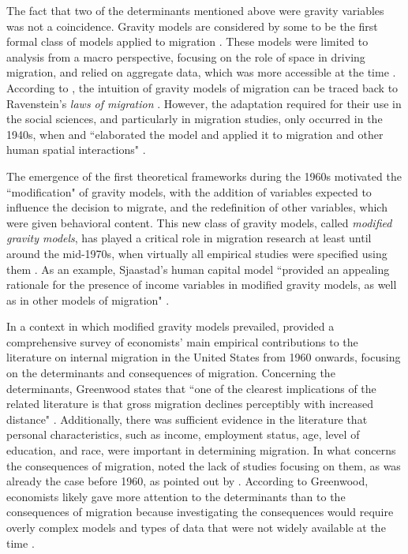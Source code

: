 The fact that two of the determinants mentioned above were gravity variables was not a coincidence. Gravity models are considered by some to be the first formal class of models applied to migration \citep{greenwood_early_2003, cushing_crossing_2004}. These models were limited to analysis from a macro perspective, focusing on the role of space in driving migration, and relied on aggregate data, which was more accessible at the time \citep{greenwood_research_1975, greenwood_internal_1997, greenwood_early_2003, cushing_crossing_2004}. According to \cite{greenwood_early_2003}, the intuition of gravity models of migration can be traced back to Ravenstein's \textit{laws of migration} \citep{ravenstein_laws_1885, ravenstein_laws_1889}. However, the adaptation required for their use in the social sciences, and particularly in migration studies, only occurred in the 1940s, when \cite{zipf_unity_1942, zipf_p1_1946} and \cite{stewart_empirical_1947} ``elaborated the model and applied it to migration and other human spatial interactions" \citep[p. 26]{greenwood_early_2003}.

The emergence of the first theoretical frameworks during the 1960s motivated the ``modification" of gravity models, with the addition of variables expected to influence the decision to migrate, and the redefinition of other variables, which were given behavioral content. This new class of gravity models, called \textit{modified gravity models}, has played a critical role in migration research at least until around the mid-1970s, when virtually all empirical studies were specified using them \citep{greenwood_research_1975, greenwood_internal_1997, greenwood_early_2003}. As an example, Sjaastad's human capital model ``provided an appealing rationale for the presence of income variables in modified gravity models, as well as in other models of migration" \citep[p. 670]{greenwood_internal_1997}. 

In a context in which modified gravity models prevailed, \cite{greenwood_research_1975} provided a comprehensive survey of economists' main empirical contributions to the literature on internal migration in the United States from 1960 onwards, focusing on the determinants and consequences of migration. Concerning the determinants, Greenwood states that ``one of the clearest implications of the related literature is that gross migration declines perceptibly with increased distance" \citep[p. 410]{greenwood_research_1975}. Additionally, there was sufficient evidence in the literature that personal characteristics, such as income, employment status, age, level of education, and race, were important in determining migration. In what concerns the consequences of migration, \cite{greenwood_research_1975} noted the lack of studies focusing on them, as was already the case before 1960, as pointed out by \cite{sjaastad_costs_1962}. According to Greenwood, economists likely gave more attention to the determinants than to the consequences of migration because investigating the consequences would require overly complex models and types of data that were not widely available at the time \citep{greenwood_research_1975}.

